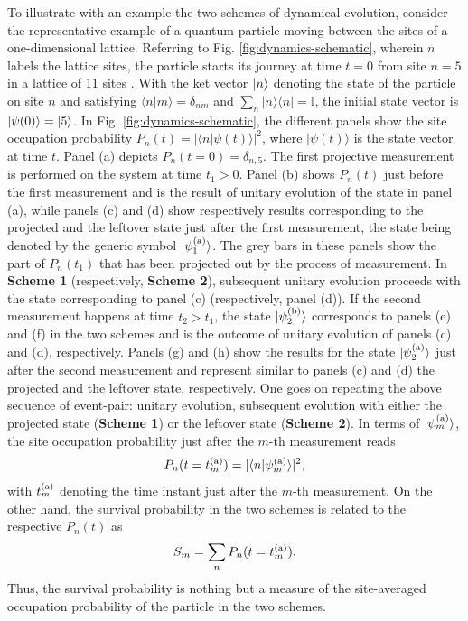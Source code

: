\documentclass[12pt]{iopart}
\def\ket#1{\mathinner{|{#1}\rangle}}
\begin{document}
To illustrate with an example the two schemes of dynamical evolution, consider the representative example of a quantum particle moving between the sites of a one-dimensional lattice.  Referring to Fig.  \ref{fig:dynamics-schematic}, wherein $n$ labels the lattice sites, the particle starts its journey at time $t=0$ from site $n=5$ in a lattice of $11$ sites \cite{note-TBM}.  With the ket vector $\ket{n}$ denoting the state of the particle on site $n$ and satisfying $\langle n|m\rangle=\delta_{nm}$ and $\sum_n |n\rangle \langle n|=\mathbb{I}$,  the initial state vector is $\ket{\psi(0)}=\ket{5}$.  In Fig.  \ref{fig:dynamics-schematic}, the different panels show the site occupation probability $P_n(t)=|\langle n|\psi(t)\rangle|^2$, where $|\psi(t)\rangle$ is the state vector at time $t$.  Panel (a) depicts $P_n(t=0)=\delta_{n,5}$. The first projective measurement is performed on the system at time $t_1>0$.  Panel (b) shows $P_n(t)$ just before the first measurement and is the result of unitary evolution of the state in panel (a),  while panels (c) and (d) show respectively results corresponding to the projected and the leftover state just after the first measurement, the state being denoted by the generic symbol $\ket{\psi_{1}^{({\rm a})}}$.  The grey bars in these panels show the part of $P_n(t_1)$ that has been projected out by the process of measurement.   In {\bf Scheme 1} (respectively, {\bf Scheme 2}),  subsequent unitary evolution proceeds with the state corresponding to panel (c) (respectively, panel (d)).  If the second measurement happens at time $t_2>t_1$,  the state $\ket{\psi_{2}^{({\rm b})}}$ corresponds to panels (e) and (f) in the two schemes and is the outcome of unitary evolution of panels (c) and (d), respectively. Panels (g) and (h) show the results for the state $\ket{\psi_{2}^{({\rm a})}}$ just after the second measurement and represent similar to panels (c) and (d) the projected and the leftover state, respectively.  One goes on repeating the above sequence of event-pair: unitary evolution, subsequent evolution with either the projected state ({\bf Scheme 1}) or the leftover state ({\bf Scheme 2}).  In terms of $|\psi_m^{({\rm a})}\rangle$, the site occupation probability just after the $m$-th measurement reads 
\begin{align}
P_n(t=t_m^{({\rm a})})=|\langle n|\psi_m^{({\rm a})}\rangle|^2,
\end{align}
with $t_m^{({\rm a})}$ denoting the time instant just after the $m$-th measurement.
On the other hand,  the survival probability in the two schemes is related to the respective $P_n(t)$ as
\begin{align}
S_m=\sum_n P_{n}(t=t_m^{({\rm a})}).
\end{align}
Thus, the survival probability is nothing but a measure of the site-averaged occupation probability of the particle in the two schemes.
 
\end{document}
